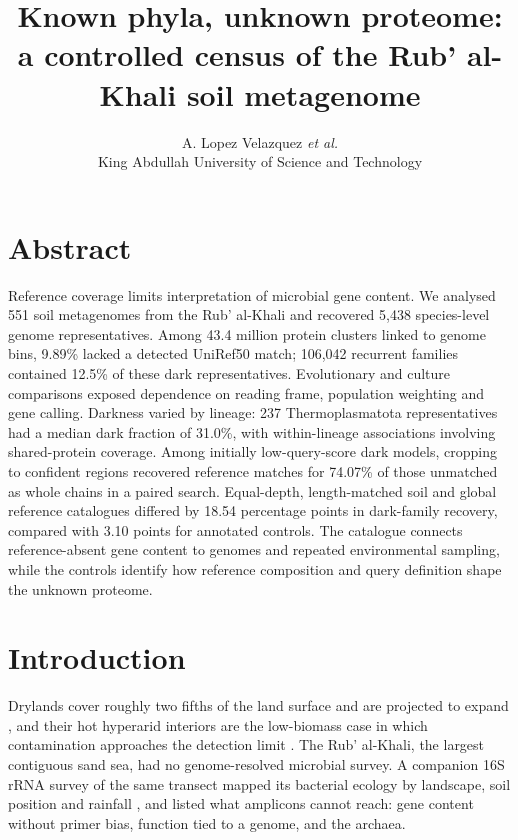 \documentclass[11pt]{article}
\title{\textbf{Known phyla, unknown proteome:\\ a controlled census of the Rub' al-Khali soil metagenome}}
\author{A. Lopez Velazquez \textit{et al.}\\ \small King Abdullah University of Science and Technology}
\date{}
\begin{document}
\maketitle

\section*{Abstract}
Reference coverage limits interpretation of microbial gene content. We analysed 551 soil
metagenomes from the Rub' al-Khali and recovered 5{,}438 species-level genome representatives.
Among 43.4 million protein clusters linked to genome bins, 9.89\% lacked a detected UniRef50
match; 106{,}042 recurrent families contained 12.5\% of these dark representatives.
Evolutionary and culture comparisons exposed dependence on reading frame, population weighting
and gene calling. Darkness varied by lineage: 237 Thermoplasmatota representatives had a median
dark fraction of 31.0\%, with within-lineage associations involving shared-protein coverage.
Among initially low-query-score dark models, cropping to confident regions recovered reference
matches for 74.07\% of those unmatched as whole chains in a paired search. Equal-depth, length-matched soil and global
reference catalogues differed by 18.54 percentage points in dark-family recovery, compared
with 3.10 points for annotated controls. The catalogue connects reference-absent gene content
to genomes and repeated environmental sampling, while the controls identify how reference
composition and query definition shape the unknown proteome.

\section*{Introduction}

Drylands cover roughly two fifths of the land surface and are projected to expand
\citep{huang2016dryland,maestre2015aridity}, and their hot hyperarid interiors are the low-biomass
case in which contamination approaches the detection limit \citep{contamination2025guidelines}. The
Rub' al-Khali, the largest contiguous sand sea, had no genome-resolved microbial survey. A companion
16S rRNA survey of the same transect mapped its bacterial ecology by landscape, soil position and
rainfall \citep{tawfiq2026companion}, and listed what
amplicons cannot reach: gene content without primer bias, function tied to a genome, and the archaea.
\end{document}
